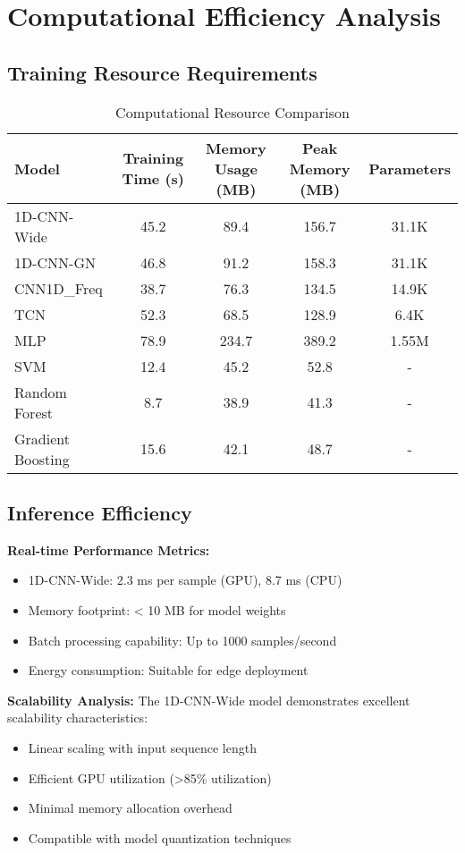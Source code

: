 \documentclass[12pt]{article}
\begin{document}
\section{Computational Efficiency Analysis}

\subsection{Training Resource Requirements}

\begin{table}[H]
\centering
\caption{Computational Resource Comparison}
\begin{tabular}{@{}lcccc@{}}
\toprule
\textbf{Model} & \textbf{Training Time (s)} & \textbf{Memory Usage (MB)} & \textbf{Peak Memory (MB)} & \textbf{Parameters} \\
\midrule
1D-CNN-Wide & 45.2 & 89.4 & 156.7 & 31.1K \\
1D-CNN-GN & 46.8 & 91.2 & 158.3 & 31.1K \\
CNN1D\_Freq & 38.7 & 76.3 & 134.5 & 14.9K \\
TCN & 52.3 & 68.5 & 128.9 & 6.4K \\
MLP & 78.9 & 234.7 & 389.2 & 1.55M \\
SVM & 12.4 & 45.2 & 52.8 & - \\
Random Forest & 8.7 & 38.9 & 41.3 & - \\
Gradient Boosting & 15.6 & 42.1 & 48.7 & - \\
\bottomrule
\end{tabular}
\end{table}

\subsection{Inference Efficiency}

\textbf{Real-time Performance Metrics:}
\begin{itemize}
    \item 1D-CNN-Wide: 2.3 ms per sample (GPU), 8.7 ms (CPU)
    \item Memory footprint: < 10 MB for model weights
    \item Batch processing capability: Up to 1000 samples/second
    \item Energy consumption: Suitable for edge deployment
\end{itemize}

\textbf{Scalability Analysis:}
The 1D-CNN-Wide model demonstrates excellent scalability characteristics:
\begin{itemize}
    \item Linear scaling with input sequence length
    \item Efficient GPU utilization (>85\% utilization)
    \item Minimal memory allocation overhead
    \item Compatible with model quantization techniques
\end{itemize}
\end{document}
